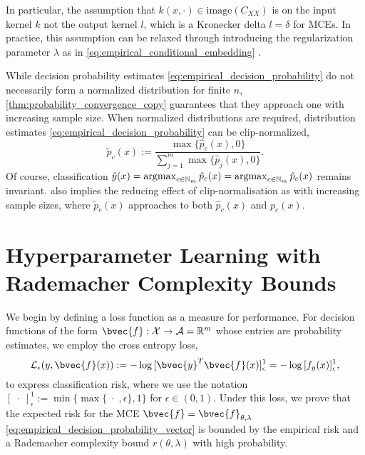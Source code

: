 \documentclass[twoside]{article}
\newcommand{\argmax}{\operatornamewithlimits{argmax}}
\begin{document}
		In particular, the assumption that $k(x, \cdot) \in \mathrm{image}(C_{XX})$ is on the input kernel $k$ not the output kernel $l$, which is a Kronecker delta $l = \delta$ for \glspl{MCE}. In practice, this assumption can be relaxed through introducing the regularization parameter $\lambda$ as in \eqref{eq:empirical_conditional_embedding} \citep{song2009hilbert}.
		
		While decision probability estimates \eqref{eq:empirical_decision_probability} do not necessarily form a normalized distribution for finite $n$, \cref{thm:probability_convergence_copy} guarantees that they approach one with increasing sample size. When normalized distributions are required, distribution estimates \eqref{eq:empirical_decision_probability} can be clip-normalized,
		\begin{equation}
		\tilde{p}_{c}(x) := \frac{\max\{\hat{p}_{c}(x), 0\}}{\sum_{j = 1}^{m} \max\{\hat{p}_{j}(x), 0\}}.
		\label{eq:empirical_decision_probability_clip_normalised}
		\end{equation}
		Of course, classification $\hat{y}(x) = \argmax_{c \in \mathbb{N}_{m}} \hat{p}_{c}(x) = \argmax_{c \in \mathbb{N}_{m}} \tilde{p}_{c}(x)$ remains invariant.   also implies the reducing effect of clip-normalisation as with increasing sample sizes, where $\tilde{p}_{c}(x)$ approaches to both $\hat{p}_{c}(x)$ and $p_{c}(x)$.
	
	\section{Hyperparameter Learning with Rademacher Complexity Bounds}
	\label{sec:hyperparameter_learning}
	

		
		We begin by defining a loss function as a measure for performance. For decision functions of the form $\bvec{f} : \mathcal{X} \to \mathcal{A} = \mathbb{R}^{m}$ whose entries are probability estimates, we employ the cross entropy loss,
		\begin{equation}
		\mathcal{L}_{\epsilon}(y, \bvec{f}(x)) := - \log{ [\bvec{y}^{T} \bvec{f}(x)]_{\epsilon}^{1} } = - \log{ [f_{y}(x)]_{\epsilon}^{1} },
		\label{eq:cross_entropy_loss_copy}
		\end{equation}
		to express classification risk, where we use the notation $[\;\cdot\;]_{\epsilon}^{1} := \min\{\max\{\;\cdot\;, \epsilon\}, 1\}$ for $\epsilon \in (0, 1)$. Under this loss, we prove that the expected risk for the \gls{MCE} $\bvec{f} = \bvec{f}_{\theta, \lambda}$ \eqref{eq:empirical_decision_probability_vector} is bounded by the empirical risk and a Rademacher complexity bound $r(\theta, \lambda)$ with high probability.
		
\end{document}
